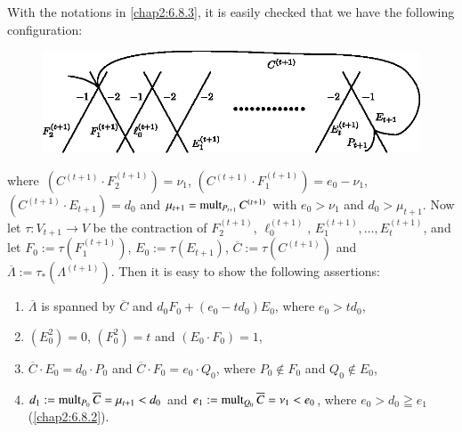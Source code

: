 \subsubsection{}\label{chap2:6.8.4}
With the notations in \ref{chap2:6.8.3}, it is easily checked that we have
the following configuration:
\begin{figure}[H]
\centering
\includegraphics{figures/chap2-fig27.eps}
\end{figure}
\noindent
where\pageoriginale\ $(C^{(t+1)}\cdot F_{2}^{(t+1)})=\nu_{1}$,
$(C^{(t+1)}\cdot F_{1}^{(t+1)})=e_{0}-\nu_{1}$, $(C^{(t+1)}\cdot
E_{t+1})=d_{0}$ and $\mu_{t+1}=\operatorname{mult}_{P_{t+1}}C^{(t+1)}$ with
$e_{0}>\nu_{1}$ and $d_{0}>\mu_{t+1}$. Now let $\tau:V_{t+1}\to V$ be
the contraction of $F^{(t+1)}_{2}$, $\ell^{(t+1)}_{0}$,
$E^{(t+1)}_{1},\ldots,E^{(t+1)}_{t}$, and let
$F_{0}:=\tau(F^{(t+1)}_{1})$, $E_{0}:=\tau(E_{t+1})$,
$\overline{C}:=\tau(C^{(t+1)})$ and
$\overline{\Lambda}:=\tau_{\ast}(\Lambda^{(t+1)})$. Then it is easy to
show the following assertions:
\begin{enumerate}
\renewcommand{\labelenumi}{\rm(\theenumi)}
\item $\overline{\Lambda}$ is spanned by $\overline{C}$ and
  $d_{0}F_{0}+(e_{0}-td_{0})E_{0}$, where $e_{0}>td_{0}$, 

\item $(E^{2}_{0})=0$, $(F^{2}_{0})=t$ and $(E_{0}\cdot F_{0})=1$,

\item $\overline{C}\cdot E_{0}=d_{0}\cdot P_{0}$ and
  $\overline{C}\cdot F_{0}=e_{0}\cdot Q_{0}$, where $P_{0}\not\in
  F_{0}$ and $Q_{0}\not\in E_{0}$,

\item $d_{1}:=\operatorname{mult}_{P_{0}}\overline{C}=\mu_{t+1}<d_{0}$ and
  $e_{1}:=\operatorname{mult}_{Q_{0}}\overline{C}=\nu_{1}<e_{0}$, where
  $e_{0}>d_{0}\geqq e_{1}$ (\cf \ref{chap2:6.8.2}).
\end{enumerate}

